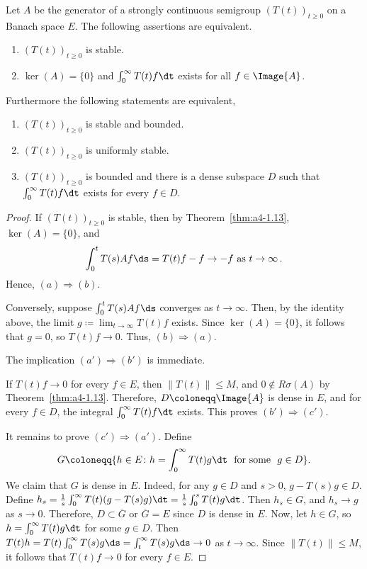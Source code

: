 \begin{theorem}\label{thm:a4-1.16}
Let $A$ be the generator of a strongly continuous semigroup $(T(t))_{t \geq 0}$ on a Banach space $E$. 
The following assertions are equivalent.
\begin{enumerate}[\upshape (a)]
\item 
$(T(t))_{t \geq 0}$ is stable.

\item 
$\ker(A) = \{0\}$ and $\int_{0}^{\infty} T(t)f  \dt$ exists for all $f \in \Image{A}$.

\end{enumerate}
Furthermore the following statements are equivalent,
\begin{enumerate}[(a')]
\item $(T(t))_{t \geq 0}$ is stable and bounded.
\item $(T(t))_{t \geq 0}$ is uniformly stable.
\item $(T(t))_{t \geq 0}$ is bounded and there is a dense subspace $D$ such that $\int_{0}^{\infty} T(t)f  \dt$ exists for every $f \in D$.
\end{enumerate}
\end{theorem}
\begin{proof}
If\/ $(T(t))_{t \geq 0}$ is stable, then by Theorem~\ref{thm:a4-1.13}, $\ker(A) = \{0\}$, and
\[{
\int_{0}^{t} T(s)Af  \ds = T(t)f - f \to -f \ \text{as} \ t \to \infty\,.
}\]
Hence, $(a) \Rightarrow (b)$.

Conversely, suppose $\int_{0}^{t} T(s)Af  \ds$ converges as $t \to \infty$. Then, by
the identity above, the limit $g \coloneqq \lim_{t \to \infty} T(t)f$ exists. 
Since $\ker(A) = \{0\}$, it follows that $g = 0$, so $T(t)f \to 0$. 
Thus, $(b) \Rightarrow (a)$.

The implication $(a') \Rightarrow (b')$ is immediate. 

If\/ $T(t)f \to 0$ for every $f \in E$, then $\|T(t)\| \leq M$, and $0 \not\in R\sigma(A)$ by Theorem~\ref{thm:a4-1.13}. 
Therefore,
$D \coloneqq \Image{A}$ is dense in $E$, and for every $f \in D$, the integral $\int_{0}^{\infty} T(t)f  \dt$ exists. 
This proves $(b') \Rightarrow (c')$. 

It remains to prove $(c') \Rightarrow (a')$.
Define 
\[
G \coloneqq \{h \in E \colon h = \int_{0}^{\infty} T(t)g  \dt \ \text{ for some } \ g \in D\}.
\] 
We claim that $G$ is dense in $E$. 
Indeed, for any $g\in D$ and $s>0$,  $g - T(s)g \in D$.
Define $h_{s} = \frac{1}{s} \int_{0}^{\infty} T(t)(g - T(s)g)  \dt = \frac{1}{s} \int_{0}^{s} T(t)g  \dt$. 
Then $h_{s} \in G$,
and $h_{s} \to g$ as $s \to 0$. 
Therefore, $D \subset \overline{G}$ or $\overline{G} = E$ since $D$ is dense in $E$. 
Now, let $h \in G$, so $h=\int_0^\infty T(t)g\dt$ for some $g\in D$.
Then $T(t)h = T(t) \int_{0}^{\infty} T(s)g  \ds = \int_{t}^{\infty} T(s)g  \ds \to 0$ as $t \to \infty$. 
Since $\|T(t)\| \leq M$, it follows that   $T(t)f \to 0$ for every $f \in E$.
\end{proof}
